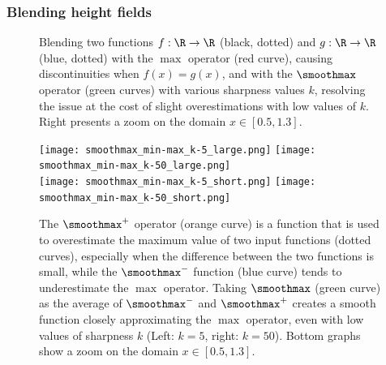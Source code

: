 \subsubsection{Blending height fields}
\label{subsubsec:height-functions-blending}

\begin{figure}[H]
    \caption{Blending two functions $f: \R \to \R$ (black, dotted) and $g: \R \to \R$ (blue, dotted) with the $\max$ operator (red curve), causing discontinuities when $f(x)=g(x)$, and with the $\smoothmax$ operator (green curves) with various sharpness values $k$, resolving the issue at the cost of slight overestimations with low values of $k$. Right presents a zoom on the domain $x \in [0.5, 1.3]$. }
    \label{fig:coral-island-blend-function-island}
\end{figure}

\begin{figure}[H]
    \texttt{[image: smoothmax\_min-max\_k-5\_large.png]}
    \texttt{[image: smoothmax\_min-max\_k-50\_large.png]} \\
    \texttt{[image: smoothmax\_min-max\_k-5\_short.png]}
    \texttt{[image: smoothmax\_min-max\_k-50\_short.png]}
    \caption{The $\smoothmax^+$ operator (orange curve) is a function that is used to overestimate the maximum value of two input functions (dotted curves), especially when the difference between the two functions is small, while the $\smoothmax^-$ function (blue curve) tends to underestimate the $\max$ operator. Taking $\smoothmax$ (green curve) as the average of $\smoothmax^-$ and $\smoothmax^+$ creates a smooth function closely approximating the $\max$ operator, even with low values of sharpness $k$ (Left: $k=5$, right: $k=50$). Bottom graphs show a zoom on the domain $x \in [0.5, 1.3]$.}
    \label{fig:coral-island-blend-function-island-with-upper}
\end{figure}

